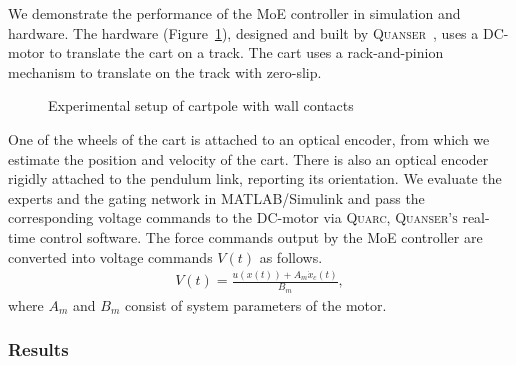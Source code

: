 %
We demonstrate the performance of the MoE controller in simulation and hardware. 
%
The hardware (Figure~\ref{fig:cartpole_hardware}), designed and built by
\textsc{Quanser}~\cite{Quanser_2021}, uses a DC-motor to translate the cart on a
track.
% 
The cart uses a rack-and-pinion mechanism to translate on the track with
zero-slip.
%
\begin{figure}[tb]
    \centering
    \caption{Experimental setup of cartpole with wall contacts}
    \label{fig:cartpole_hardware}
\end{figure}
%
One of the wheels of the cart is attached to an optical encoder, from which we
estimate the position and velocity of the cart.
%
There is also an optical encoder rigidly attached to the pendulum link,
reporting its orientation. 
%
We evaluate the experts and the gating network in MATLAB/Simulink and pass the
corresponding voltage commands to the DC-motor via \textsc{Quarc},
\textsc{Quanser's} real-time control software.
%
The force commands output by the MoE controller are converted into voltage
commands $V(t)$ as follows.
%
\begin{align*}
    V(t) = \frac{u(x(t)) + A_m \dot{x}_c(t)}{B_m},
\end{align*} 
\noindent where $A_m$ and $B_m$ consist of system parameters of the motor.
%


\subsubsection{Results}

